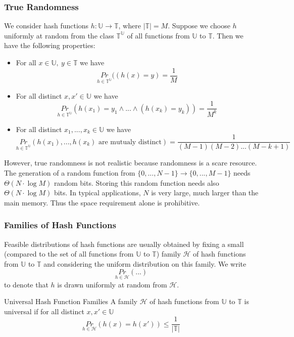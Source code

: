 \documentclass[english]{panikzettel}
\begin{document}
\subsubsection{True Randomness}
We consider hash functions $h:\mathbb{U}\to \mathbb{T}$, where $|\mathbb{T}|=M$. Suppose we choose $h$ uniformly at random from the class $\mathbb{T}^\mathbb{U}$ of all functions from $\mathbb{U}$ to $\mathbb{T}$. Then we have the following properties:
\begin{itemize}
\item For all $x\in\mathbb{U}, \ y\in \mathbb{T}$ we have
\[
\underset{h\in\mathbb{T}^\mathbb{U}}{Pr}((h(x)=y)=\frac{1}{M}
\]
\item For all distinct $x,x'\in\mathbb{U}$ we have
\[
\underset{h\in\mathbb{T}^\mathbb{U}}{Pr}(h(x_1)=y_1 \wedge ... \wedge (h(x_k)=y_k))=\frac{1}{M^k}
\]
\item For all distinct $x_1,...,x_k\in\mathbb{U}$ we have
\[
\underset{h\in\mathbb{T}^\mathbb{U}}{Pr}(h(x_1),...,h(x_k) \text{ are mutualy distinct})=\frac{1}{(M-1)(M-2)...(M-k+1)}
\]
\end{itemize}
However, true randomness is not realistic because randomness is a scare resource. The generation of a random function from $\{0,...,N-1 \} \to \{0,...,M-1 \}$ needs $\Theta(N\cdot \log M)$ random bits. Storing this random function needs also $\Theta(N\cdot \log M)$ bits. In typical applications, $N$ is very large, much larger than the main memory. Thus the space requirement alone is prohibitive.

\subsubsection{Families of Hash Functions}
Feasible distributions of hash functions are usually obtained by fixing a small (compared to the set of all functions from $\mathbb{U}$ to $\mathbb{T}$) family $\mathcal{H}$ of hash functions from $\mathbb{U}$ to $\mathbb{T}$ and considering the uniform distribution on
this family. We write
\[
\underset{h\in\mathcal{H}}{Pr}(...)
\]
to denote that $h$ is drawn uniformly at random from $\mathcal{H}$.

\begin{defi}{Universal Hash Function Families}
A family $\mathcal{H}$ of hash functions from $\mathbb{U}$ to $\mathbb{T}$ is universal if for all distinct $x,x'\in \mathbb{U}$
\[
\underset{h\in\mathcal{H}}{Pr}(h(x)=h(x'))\leq \frac{1}{|\mathbb{T}|}
\]
\end{defi}
\end{document}
